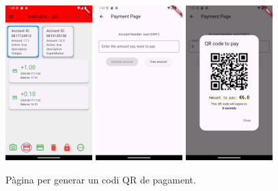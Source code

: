 \documentclass[a4paper,12pt,twoside]{ThesisStyle}
\begin{document}
\begin{figure}[h]
    \centering
    \includegraphics[width=0.3\textwidth]{imatges/mainPage2.png}
    \includegraphics[width=0.3\textwidth]{imatges/paymentPage.png}
    \includegraphics[width=0.3\textwidth]{imatges/paymentPageWithValue.png}
    \caption{Pàgina per generar un codi QR de pagament.}
    \label{fig: Pàgina per generar codi QR de pagament}
\end{figure}
\end{document}
